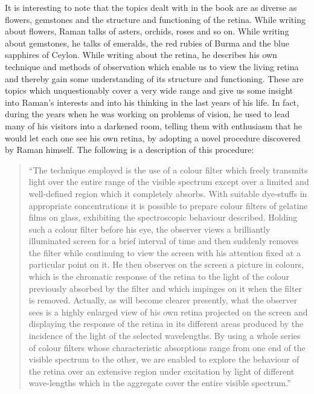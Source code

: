 It is interesting to note that the topics dealt with in the book
are as diverse as flowers, gemstones and the structure and
functioning of the retina. While writing about flowers, Raman
talks of asters, orchids, roses and so on. While writing about
gemstones, he talks of emeralds, the red rubies of Burma and
the blue sapphires of Ceylon. While writing about the retina, he
describes his own technique and methods of observation which
enable us to view the living retina and thereby gain some
understanding of its structure and functioning. These are topics
which unquestionably cover a very wide range and give us some
insight into Raman's interests and into his thinking in the last
years of his life. In fact, during the years when he was working
on problems of vision, he used to lead many of his visitors into
a darkened room, telling them with enthusiasm that he would
let each one see his own retina, by adopting a novel procedure
discovered by Raman himself. The following is a description of
this procedure:
\begin{quote}
{\fontsize{10}{12}\selectfont
``The technique employed is the use of a colour filter which
freely transmits light over the entire range of the visible spectrum
except over a limited and well-defined region which it completely
absorbs. With suitable dye-stuffs in appropriate concentrations
it is possible to prepare colour filters of gelatine films on glass,
exhibiting the spectroscopic behaviour described. Holding such
a colour filter before his eye, the observer views a brilliantly
illuminated screen for a brief interval of time and then suddenly
removes the filter while continuing to view the screen with his
attention fixed at a particular point on it. He then observes on
the screen a picture in colours, which is the chromatic response
of the retina to the light of the colour previously absorbed by the
filter and which impinges on it when the filter is removed.
Actually, as will become clearer presently, what the observer sees
is a highly enlarged view of his own retina projected on the screen
and displaying the response of the retina in its different areas
produced by the incidence of the light of the selected wavelengths.
By using a whole series of colour filters whose characteristic
absorptions range from one end of the visible spectrum to the
other, we are enabled to explore the behaviour of the retina over
an extensive region under excitation by light of different wave-lengths
 which in the aggregate cover the entire visible spectrum.''}\relax
\end{quote}

